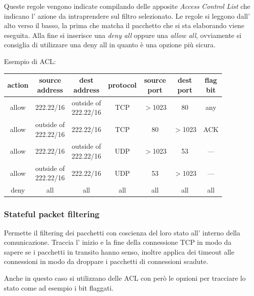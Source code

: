 Queste regole vengono indicate compilando delle apposite \emph{Access Control List} che indicano l' azione da intraprendere sul filtro selezionato.
Le regole si leggono dall' alto verso il basso, la prima che matcha il pacchetto che si sta elaborando viene eseguita.
Alla fine si inserisce una \emph{deny all} oppure una \emph{allow all}, ovviamente si consiglia di utilizzare una deny all in quanto è una opzione più sicura.

Esempio di ACL:
\begin{table}[ht!]
    \centering
    \begin{tabular}{c|c|c|c|c|c|c}
        action & \thead{source \\ address} & \thead{dest \\ address} & protocol & \thead{source \\ port} & \thead{dest \\ port} & \thead{flag \\ bit}  \\
        \hline
        allow & 222.22/16 & \thead{outside of \\ 222.22/16} & TCP & $>$1023 & 80 & any \\ 
        allow & \thead{outside of \\ 222.22/16} & 222.22/16 & TCP & 80 & $>$1023 & ACK \\
        allow & 222.22/16 & \thead{outside of \\ 222.22/16} & UDP & $>$1023 & 53 & --- \\
        allow & \thead{outside of \\ 222.22/16} & 222.22/16 & UDP & 53 & $>$1023 & --- \\ 
        deny & all & all & all & all & all & all \\ 
    \end{tabular}
\end{table}

\subsubsection{Stateful packet filtering}
Permette il filtering dei pacchetti con coscienza del loro stato all' interno della comunicazione.
Traccia l' inizio e la fine della connessione TCP in modo da sapere se i pacchetti in transito hanno senso, inoltre applica dei timeout alle connessioni in modo da droppare i pacchetti di connessioni scadute.

Anche in questo caso si utilizzano delle ACL con però le opzioni per tracciare lo stato come ad esempio i bit flaggati.

